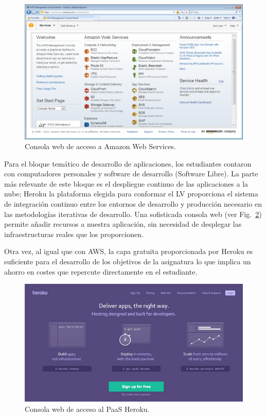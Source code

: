 \documentclass[conference]{IEEEtran}
\begin{document}
\begin{figure}[!t]
\centering
\includegraphics[width=\columnwidth]{aws_management_console_home.png}
\caption{Consola web de acceso a Amazon Web Services.}
\label{fig:console}
\end{figure} 

Para el bloque temático de desarrollo de aplicaciones, los estudiantes contaron con computadores personales y software de desarrollo (Software Libre).
La parte más relevante de este bloque es el despliegue continuo de las aplicaciones a la nube; Heroku la plataforma elegida para conformar el LV proporciona
el sistema de integración continuo entre los entornos de desarrollo y producción necesario en las metodologías iterativas de desarrollo.
Una sofisticada consola web (ver Fig.~\ref{fig:heroku}) permite añadir recursos a nuestra aplicación,
sin necesidad de desplegar las infraestructuras reales que los proporcionen.

Otra vez, al igual que con AWS, la capa gratuita proporcionada por Heroku es suficiente para el desarrollo de los objetivos de la asignatura lo que implica un ahorro en costes que repercute directamente en el estudiante.

\begin{figure}[!t]
\centering
\includegraphics[width=\columnwidth]{heroku.jpeg}
\caption{Consola web de acceso al PaaS Heroku.}
\label{fig:heroku}
\end{figure}
\end{document}
